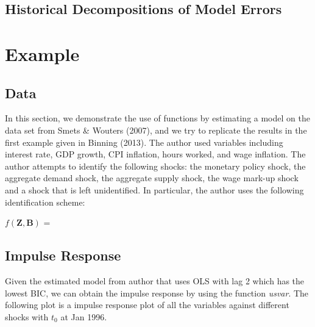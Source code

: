\documentclass[11pt]{article}\usepackage[]{graphicx}\usepackage[]{color}
\begin{document}
  \subsection{Historical Decompositions of Model Errors}
  
\section{Example}
\subsection{Data}
In this section, we demonstrate the use of functions by estimating a model on the data set from Smets \& Wouters (2007), and we try to replicate the results in the first example given in Binning (2013). The author used variables including interest rate, GDP growth, CPI inflation, hours worked, and wage inflation. The author attempts to identify the following shocks: the monetary policy shock, the aggregate demand shock, the aggregate supply shock, the wage mark-up shock and a shock that is left unidentified. In particular, the author uses the following identification scheme:

\begin{center}
$f(\mathbf{Z},\mathbf{B})$ = 
\end{center}

\subsection{Impulse Response}
Given the estimated model from author that uses OLS with lag 2 which has the lowest BIC, we can obtain the impulse response by using the function \textit{usvar}. The following plot is a impulse response plot of all the variables against different shocks with $t_{0}$ at Jan 1996.
\end{document}
